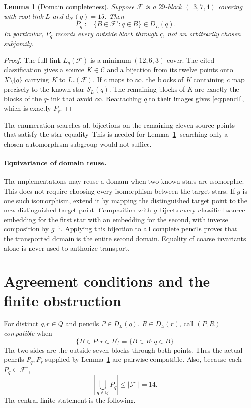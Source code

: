 \documentclass[11pt]{article}
\newcommand{\coverfam}{\mathcal F}
\newcommand{\cat}{\mathcal C}
\newtheorem{lemma}[theorem]{Lemma}
\theoremstyle{definition}
\theoremstyle{remark}
\begin{document}
\begin{lemma}[Domain completeness]\label{lem:domain}
Suppose $\coverfam$ is a $29$-block $(13,7,4)$ covering with root link
$L$ and $d_\coverfam(q)=15$. Then
\[
 P_q:=\{B\in\coverfam^\circ:q\in B\}\in D_L(q).
\]
In particular, $P_q$ records \emph{every} outside block through $q$,
not an arbitrarily chosen subfamily.
\end{lemma}
\begin{proof}
The full link $L_q(\coverfam)$ is a minimum $(12,6,3)$ cover.
The cited classification gives a source $K\in\cat$ and a bijection
from its twelve points onto $X\setminus\{q\}$ carrying $K$ to
$L_q(\coverfam)$. If $c$ maps to $\infty$, the blocks of $K$ containing
$c$ map precisely to the known star $S_L(q)$.
The remaining blocks of $K$ are exactly the blocks of the $q$-link
that avoid $\infty$. Reattaching $q$ to their images gives
\eqref{eq:pencil}, which is exactly $P_q$.
\end{proof}

The enumeration searches all bijections on the remaining eleven
source points that satisfy the star equality. This is needed for
Lemma~\ref{lem:domain}: searching only a chosen automorphism subgroup
would not suffice.

\paragraph{Equivariance of domain reuse.}
The implementations may reuse a domain when two known stars are
isomorphic. This does not require choosing every isomorphism between
the target stars. If $g$ is one such isomorphism, extend it by mapping
the distinguished target point to the new distinguished target point.
Composition with $g$ bijects every classified source embedding for the
first star with an embedding for the second, with inverse composition
by $g^{-1}$. Applying this bijection to all complete pencils proves
that the transported domain is the entire second domain. Equality of
coarse invariants alone is never used to authorize transport.

\section{Agreement conditions and the finite obstruction}
For distinct $q,r\in Q$ and pencils $P\in D_L(q)$,
$R\in D_L(r)$, call $(P,R)$ \emph{compatible} when
\begin{equation}\label{eq:pair}
 \{B\in P:r\in B\}=\{B\in R:q\in B\}.
\end{equation}
The two sides are the outside seven-blocks through both points.
Thus the actual pencils $P_q,P_r$ supplied by Lemma~\ref{lem:domain}
are pairwise compatible. Also, because each $P_q\subseteq\coverfam^\circ$,
\begin{equation}\label{eq:budget}
 \left|\bigcup_{q\in Q}P_q\right|\leq|\coverfam^\circ|=14.
\end{equation}
The central finite statement is the following.
\end{document}
